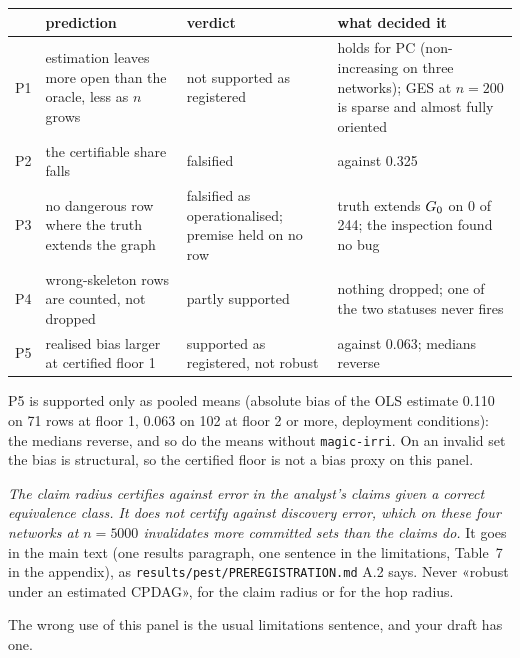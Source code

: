 \begin{center}\footnotesize
\begin{tabular}{@{}l>{\raggedright\arraybackslash}p{4.4cm}>{\raggedright\arraybackslash}p{3.1cm}>{\raggedright\arraybackslash}p{6.0cm}@{}}
\toprule
& \textbf{prediction} & \textbf{verdict} & \textbf{what decided it} \\
\midrule
P1 & estimation leaves more open than the oracle, less as $n$ grows & not supported as registered &
holds for PC (non-increasing on three networks); GES at $n = 200$ is sparse and almost fully oriented \\
P2 & the certifiable share falls & falsified & 0.475 against 0.325 \\
P3 & no dangerous row where the truth extends the graph & falsified as operationalised; premise held
on no row & truth extends $G_0$ on 0 of 244; the inspection found no bug \\
P4 & wrong-skeleton rows are counted, not dropped & partly supported & nothing dropped; one of the two
statuses never fires \\
P5 & realised bias larger at certified floor 1 & supported as registered, not robust & 0.110 against
0.063; medians reverse \\
\bottomrule
\end{tabular}
\end{center}

P5 is supported only as pooled means (absolute bias of the OLS estimate 0.110 on 71 rows at floor 1,
0.063 on 102 at floor 2 or more, deployment conditions): the medians reverse, and so do the means
without \texttt{magic-irri}. On an invalid set the bias is structural, so the certified floor is not a
bias proxy on this panel.

\begin{sonorio}
\emph{The claim radius certifies against error in the analyst's claims given a correct equivalence
class. It does not certify against discovery error, which on these four networks at $n = 5000$
invalidates more committed sets than the claims do.} It goes in the main text (one results paragraph,
one sentence in the limitations, Table~7 in the appendix), as \texttt{results/pest/PREREGISTRATION.md}
A.2 says. Never «robust under an estimated
CPDAG», for the claim radius or for the hop radius.
\end{sonorio}

The wrong use of this panel is the usual limitations sentence, and your draft has one.

